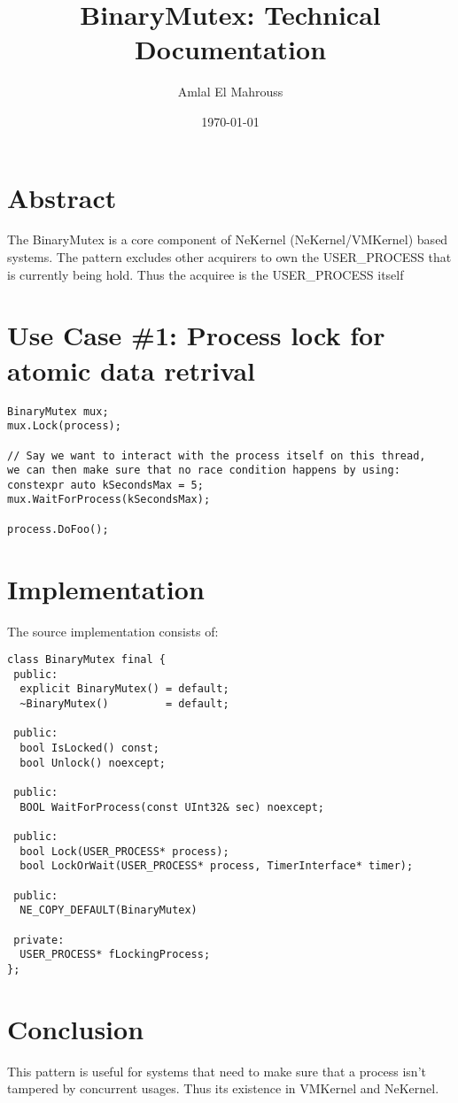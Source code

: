 \documentclass{article}
\title{BinaryMutex: Technical Documentation}
\author{Amlal El Mahrouss}
\date{\today}
\begin{document}
\maketitle

\section{Abstract}

{The BinaryMutex is a core component of NeKernel (NeKernel/VMKernel) based systems. The pattern excludes other acquirers to own the USER\_PROCESS that is currently being hold. Thus the acquiree is the USER\_PROCESS itself}

\section{Use Case \#1: Process lock for atomic data retrival}

\begin{verbatim}
BinaryMutex mux;
mux.Lock(process);

// Say we want to interact with the process itself on this thread, 
we can then make sure that no race condition happens by using:
constexpr auto kSecondsMax = 5;
mux.WaitForProcess(kSecondsMax);

process.DoFoo();
\end{verbatim}

\section{Implementation}

The source implementation consists of:

\begin{verbatim}
class BinaryMutex final {
 public:
  explicit BinaryMutex() = default;
  ~BinaryMutex()         = default;

 public:
  bool IsLocked() const;
  bool Unlock() noexcept;

 public:
  BOOL WaitForProcess(const UInt32& sec) noexcept;

 public:
  bool Lock(USER_PROCESS* process);
  bool LockOrWait(USER_PROCESS* process, TimerInterface* timer);

 public:
  NE_COPY_DEFAULT(BinaryMutex)

 private:
  USER_PROCESS* fLockingProcess;
};
\end{verbatim}

\section{Conclusion}

This pattern is useful for systems that need to make sure that a process isn't tampered by concurrent usages. Thus its existence in VMKernel and NeKernel.
\end{document}
